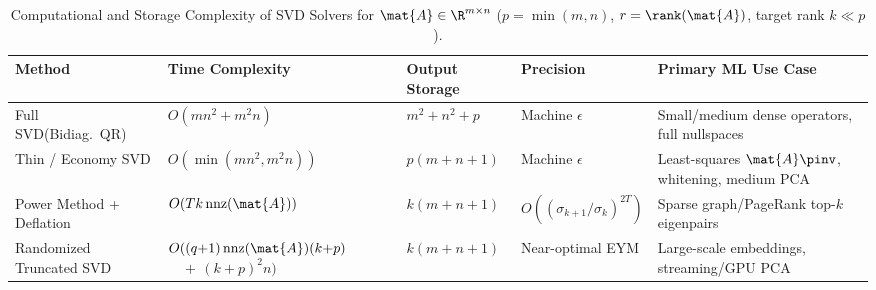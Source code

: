 \documentclass[../../../../master.tex]{subfiles}
\begin{document}
\begin{table}[htbp]
\centering
\caption{Computational and Storage Complexity of SVD Solvers for $\mat{A} \in \R^{m \times n}$ ($p=\min(m,n)$, $r=\rank(\mat{A})$, target rank $k \ll p$).}
\label{tab:svd:complexity}
\footnotesize
\begin{tabularx}{\textwidth}{@{}>{\raggedright\arraybackslash}p{2.45cm}>{\raggedright\arraybackslash}p{3.55cm}>{\raggedright\arraybackslash}p{2.0cm}>{\raggedright\arraybackslash}p{2.4cm}>{\raggedright\arraybackslash}X@{}}
\toprule
\textbf{Method} & \textbf{Time Complexity} & \textbf{Output Storage} & \textbf{Precision} & \textbf{Primary ML Use Case} \\
\midrule
Full SVD\newline(Bidiag.\ QR) & $O(mn^2 + m^2n)$ & $m^2 + n^2 + p$ & Machine $\epsilon$ & Small/medium dense operators, full nullspaces \\
Thin / Economy SVD & $O(\min(mn^2, m^2n))$ & $p(m + n + 1)$ & Machine $\epsilon$ & Least-squares $\mat{A}\pinv$, whitening, medium PCA \\
Power Method + Deflation & $O(T k\,\mathrm{nnz}(\mat{A}))$ & $k(m + n + 1)$ & $O((\sigma_{k+1}/\sigma_k)^{2T})$ & Sparse graph/PageRank top-$k$ eigenpairs \\
Randomized Truncated SVD & $O((q{+}1)\,\mathrm{nnz}(\mat{A})(k{+}p)$\newline$\quad +\, (k{+}p)^2 n)$ & $k(m + n + 1)$ & Near-optimal EYM & Large-scale embeddings, streaming/GPU PCA \\
\bottomrule
\end{tabularx}
\end{table}
\end{document}
